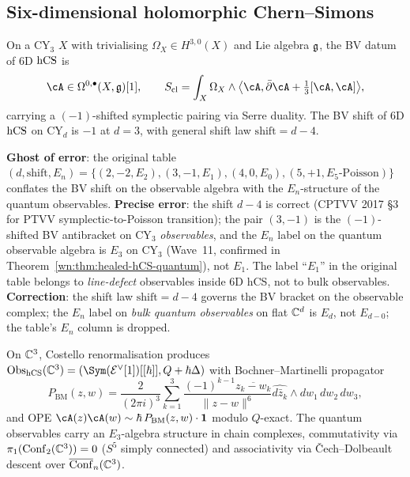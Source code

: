 \subsection{Six-dimensional holomorphic Chern--Simons}
\label{wn:subsec:healed-6d-hCS}

\begin{theorem}\ClaimStatusHealed
\label{wn:thm:healed-hCS-classical}
On a CY$_3$ $X$ with trivialising $\Omega_X \in H^{3, 0}(X)$ and Lie algebra $\mathfrak{g}$, the BV datum of 6D $\mathrm{hCS}$ is
\[
\cA \in \Omega^{0, \bullet}(X, \fg)[1], \qquad
S_{\mathrm{cl}} = \int_X \Omega_X \wedge \bigl\langle \cA, \bar\partial \cA + \tfrac{1}{3}[\cA, \cA]\bigr\rangle,
\]
carrying a $(-1)$-shifted symplectic pairing via Serre duality. The BV shift of 6D $\mathrm{hCS}$ on CY$_d$ is $-1$ at $d = 3$, with general shift law $\mathrm{shift} = d - 4$.
\end{theorem}

\textbf{Ghost of error}: the original table $(d, \mathrm{shift}, E_n) = \{(2, -2, E_2), (3, -1, E_1), (4, 0, E_0), (5, +1, E_5\text{-Poisson})\}$ conflates the BV shift on the observable algebra with the $E_n$-structure of the quantum observables. \textbf{Precise error}: the shift $d - 4$ is correct (CPTVV 2017 \S3 for PTVV symplectic-to-Poisson transition); the pair $(3, -1)$ is the $(-1)$-shifted BV antibracket on CY$_3$ \emph{observables}, and the $E_n$ label on the quantum observable algebra is $E_3$ on CY$_3$ (Wave~11, confirmed in Theorem~\ref{wn:thm:healed-hCS-quantum}), not $E_1$. The label ``$E_1$'' in the original table belongs to \emph{line-defect} observables inside 6D hCS, not to bulk observables. \textbf{Correction}: the shift law $\mathrm{shift} = d - 4$ governs the BV bracket on the observable complex; the $E_n$ label on \emph{bulk quantum observables} on flat $\mathbb{C}^d$ is $E_d$, not $E_{d - 0}$; the table's $E_n$ column is dropped.

\begin{theorem}\ClaimStatusHealed
\label{wn:thm:healed-hCS-quantum}
On $\mathbb{C}^3$, Costello renormalisation produces
$\Obs_{\hCS}(\CC^3) = (\Sym(\cE^\vee[1])[[\hbar]], Q + \hbar\Delta)$
with Bochner--Martinelli propagator
\[
P_{\mathrm{BM}}(z, w) = \frac{2}{(2\pi i)^3} \sum_{k = 1}^3 \frac{(-1)^{k-1} \overline{z_k - w_k}}{\|z - w\|^6} \widehat{d\bar z_k} \wedge dw_1\, dw_2\, dw_3,
\]
and OPE $\cA(z)\cA(w) \sim \hbar\, P_{\mathrm{BM}}(z, w) \cdot \mathbf 1$ modulo $Q$-exact.
The quantum observables carry an $E_3$-algebra structure in chain complexes, commutativity via $\pi_1(\mathrm{Conf}_2(\mathbb{C}^3)) = 0$ ($S^5$ simply connected) and associativity via \v{C}ech--Dolbeault descent over $\overline{\mathrm{Conf}}_n(\mathbb{C}^3)$.
\end{theorem}

